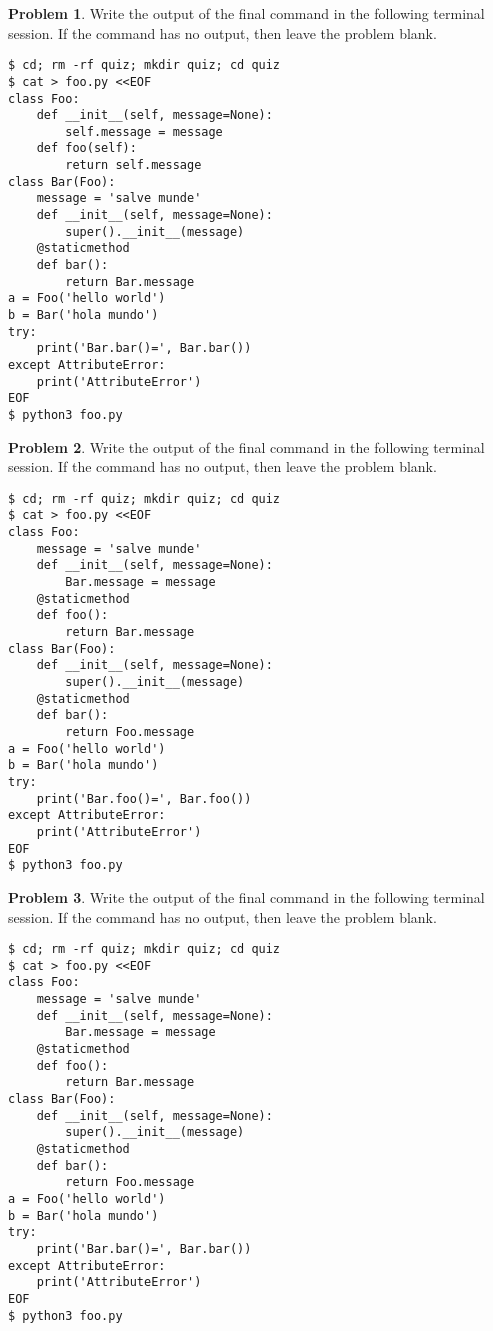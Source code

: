 \documentclass[10pt]{article}
\theoremstyle{definition}
\newtheorem{problem}{Problem}
\begin{document}
\filbreak
\begin{problem}
    Write the output of the final command in the following terminal session.
    If the command has no output, then leave the problem blank.
\end{problem}
\begin{lstlisting}
$ cd; rm -rf quiz; mkdir quiz; cd quiz
$ cat > foo.py <<EOF
class Foo:
    def __init__(self, message=None):
        self.message = message
    def foo(self):
        return self.message
class Bar(Foo):
    message = 'salve munde'
    def __init__(self, message=None):
        super().__init__(message)
    @staticmethod
    def bar():
        return Bar.message
a = Foo('hello world')
b = Bar('hola mundo')
try:
    print('Bar.bar()=', Bar.bar())
except AttributeError:
    print('AttributeError') 
EOF
$ python3 foo.py
\end{lstlisting}


\filbreak
\begin{problem}
    Write the output of the final command in the following terminal session.
    If the command has no output, then leave the problem blank.
\end{problem}
\begin{lstlisting}
$ cd; rm -rf quiz; mkdir quiz; cd quiz
$ cat > foo.py <<EOF
class Foo:
    message = 'salve munde'
    def __init__(self, message=None):
        Bar.message = message
    @staticmethod
    def foo():
        return Bar.message
class Bar(Foo):
    def __init__(self, message=None):
        super().__init__(message)
    @staticmethod
    def bar():
        return Foo.message
a = Foo('hello world')
b = Bar('hola mundo')
try:
    print('Bar.foo()=', Bar.foo())
except AttributeError:
    print('AttributeError') 
EOF
$ python3 foo.py
\end{lstlisting}


\filbreak
\begin{problem}
    Write the output of the final command in the following terminal session.
    If the command has no output, then leave the problem blank.
\end{problem}
\begin{lstlisting}
$ cd; rm -rf quiz; mkdir quiz; cd quiz
$ cat > foo.py <<EOF
class Foo:
    message = 'salve munde'
    def __init__(self, message=None):
        Bar.message = message
    @staticmethod
    def foo():
        return Bar.message
class Bar(Foo):
    def __init__(self, message=None):
        super().__init__(message)
    @staticmethod
    def bar():
        return Foo.message
a = Foo('hello world')
b = Bar('hola mundo')
try:
    print('Bar.bar()=', Bar.bar())
except AttributeError:
    print('AttributeError') 
EOF
$ python3 foo.py
\end{lstlisting}
\end{document}
